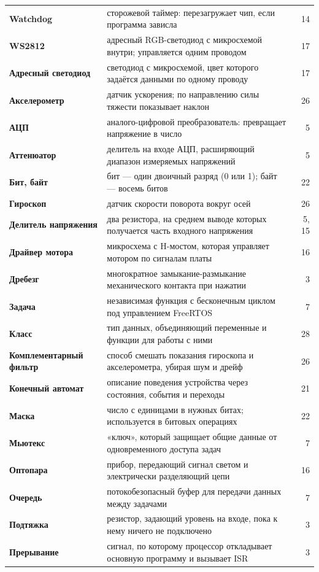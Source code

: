 {\begin{xltabular}{\textwidth}{@{}>{\bfseries}p{40mm} X r@{}}
Watchdog & сторожевой таймер: перезагружает чип, если программа зависла & 14 \\
WS2812 & адресный RGB-светодиод с микросхемой внутри; управляется одним проводом & 17 \\
Адресный светодиод & светодиод с микросхемой, цвет которого задаётся данными по одному проводу & 17 \\
Акселерометр & датчик ускорения; по направлению силы тяжести показывает наклон & 26 \\
АЦП & аналого-цифровой преобразователь: превращает напряжение в число & 5 \\
Аттенюатор & делитель на входе АЦП, расширяющий диапазон измеряемых напряжений & 5 \\
Бит, байт & бит --- один двоичный разряд (0 или 1); байт --- восемь битов & 22 \\
Гироскоп & датчик скорости поворота вокруг осей & 26 \\
Делитель напряжения & два резистора, на среднем выводе которых получается часть входного напряжения & 5, 15 \\
Драйвер мотора & микросхема с H-мостом, которая управляет мотором по сигналам платы & 16 \\
Дребезг & многократное замыкание-размыкание механического контакта при нажатии & 3 \\
Задача & независимая функция с бесконечным циклом под управлением FreeRTOS & 7 \\
Класс & тип данных, объединяющий переменные и функции для работы с ними & 28 \\
Комплементарный фильтр & способ смешать показания гироскопа и акселерометра, убирая шум и дрейф & 26 \\
Конечный автомат & описание поведения устройства через состояния, события и переходы & 21 \\
Маска & число с единицами в нужных битах; используется в битовых операциях & 22 \\
Мьютекс & «ключ», который защищает общие данные от одновременного доступа задач & 7 \\
Оптопара & прибор, передающий сигнал светом и электрически разделяющий цепи & 16 \\
Очередь & потокобезопасный буфер для передачи данных между задачами & 7 \\
Подтяжка & резистор, задающий уровень на входе, пока к нему ничего не подключено & 3 \\
Прерывание & сигнал, по которому процессор откладывает основную программу и вызывает ISR & 3 \\

\end{xltabular}}

